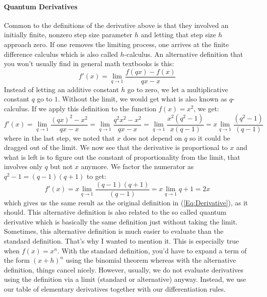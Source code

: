 \paragraph{Quantum Derivatives}
Common to the definitions of the derivative above is that they involved an initially finite, nonzero step size parameter $h$ and letting that step size $h$ approach zero. If one removes the limiting process, one arrives at the finite difference calculus which is also called $h$-calculus. An alternative definition that you won't usually find in general math textbooks is this:
\begin{equation}
 f'(x) = \lim_{q \rightarrow 1} \frac{f(q x) - f(x)}{ q x - x }
\end{equation}
Instead of letting an additive constant $h$ go to zero, we let a multiplicative constant $q$ go to $1$. Without the limit, we would get what is also known as $q$-calculus. If we apply this definition to the function $f(x) = x^2$, we get:
\begin{equation}
f'(x) = \lim_{q \rightarrow 1} \frac{(q x)^2 - x^2}{ q x - x }
      = \lim_{q \rightarrow 1} \frac{q^2 x^2 - x^2}{ q x - x }
      = \lim_{q \rightarrow 1} \frac{x^2 (q^2 - 1)}{ x (q - 1)}
      = x \lim_{q \rightarrow 1} \frac{(q^2 - 1)}{(q - 1)}         
\end{equation}
where in the last step, we noted that $x$ does not depend on $q$ so it could be dragged out of the limit. We now see that the derivative is proportional to $x$ and what is left is to figure out the constant of proportionality from the limit, that involves only $q$ but not $x$ anymore. We factor the numerator as $q^2 - 1 = (q-1)(q+1)$ to get:
\begin{equation}
f'(x) = x \lim_{q \rightarrow 1} \frac{(q-1)(q+1)}{(q - 1)}     
      = x \lim_{q \rightarrow 1} q+1
      = 2 x
\end{equation}
which gives us the same result as the original definition in (\ref{Eq:Derivative}), as it should. This alternative definition is also related to the so called quantum derivative which is basically the same definition just without taking the limit. Sometimes, this alternative definition is much easier to evaluate than the standard definition. That's why I wanted to mention it. This is especially true when $f(x) = x^n$. With the standard definition, you'd have to expand a term of the form $(x+h)^n$ using the binomial theorem whereas with the alternative definition, things cancel nicely. However, usually, we do not evaluate derivatives using the definition via a limit (standard or alternative) anyway. Instead, we use our table of elementary derivatives together with our differentiation rules.

